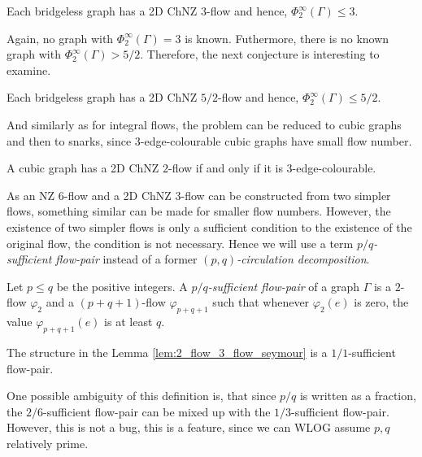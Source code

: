 \begin{proposition} \emph{\cite[p. 343]{svk}}
    Each bridgeless graph has a 2D ChNZ $3$-flow and hence, $\Phi_2^\infty(\Gamma)\leq 3$.\label{prop:chebyshev_upper_seymour}
\end{proposition}

Again, no graph with $\Phi_2^\infty(\Gamma)=3$ is known. Futhermore, there is no known graph with $\Phi_2^\infty(\Gamma)>5/2$. Therefore, the next conjecture is interesting to examine.

\begin{conjecture} \emph{\cite[p. 344]{svk}}
    Each bridgeless graph has a 2D ChNZ $5/2$-flow and hence, $\Phi_2^\infty(\Gamma)\leq 5/2$.\label{conj:chebyshev_upper_seymour}
\end{conjecture}

And similarly as for integral flows, the problem can be reduced to cubic graphs and then to snarks, since $3$-edge-colourable cubic graphs have small flow number.

\begin{theorem} \emph{\cite[p. 343]{svk}}
    A cubic graph has a 2D ChNZ $2$-flow if and only if it is $3$-edge-colourable.\label{th:2_chnzf_iff_3_col}
\end{theorem}

As an NZ $6$-flow and a 2D ChNZ $3$-flow can be constructed from two simpler flows, something similar can be made for smaller flow numbers. However, the existence of two simpler flows is only a sufficient condition to the existence of the original flow, the condition is not necessary. Hence we will use a term \emph{$p/q$-sufficient flow-pair} instead of a former \emph{$(p,q)$-circulation decomposition}.

\begin{definition}
        Let $p\leq q$ be the positive integers. A \emph{$p/q$-sufficient flow-pair} of a graph $\Gamma$ is a $2$-flow $\varphi_2$ and a $(p+q+1)$-flow $\varphi_{p+q+1}$ such that whenever $\varphi_2(e)$ is zero, the value $\varphi_{p+q+1}(e)$ is at least $q$.
\end{definition}

\begin{remark}
	The structure in the Lemma \ref{lem:2_flow_3_flow_seymour} is a $1/1$-sufficient flow-pair.
\end{remark}

One possible ambiguity of this definition is, that since $p/q$ is written as a fraction, the $2/6$-sufficient flow-pair can be mixed up with the $1/3$-sufficient flow-pair. However, this is not a bug, this is a feature, since we can WLOG assume $p,q$ relatively prime.

